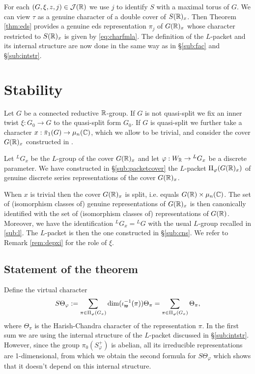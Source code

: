 \documentclass{article}
\theoremstyle{definition}
\numberwithin{equation}{section}
\renewcommand{\-}{\hyp{}}
\begin{document}
For each $(G,\xi,z,j) \in \mathcal{J}(\mathbb{R})$ we use $j$ to identify $S$ with a maximal torus of $G$. We can view $\tau$ as a genuine character of a double cover of $S(\mathbb{R})_x$. Then Theorem \ref{thm:eds} provides a genuine eds representation $\pi_j$ of $G(\mathbb{R})_x$ whose character restricted to $S(\mathbb{R})_x$ is given by \eqref{eq:charfmla}. The definition of the $L$-packet and its internal structure are now done in the same way as in \S\ref{sub:fac} and \S\ref{sub:intstr}.

\section{Stability} \label{sec:stab}

Let $G$ be a connected reductive $\mathbb{R}$-group. If $G$ is not quasi-split we fix an inner twist $\xi : G_0 \to G$ to the quasi-split form $G_0$. If $G$ is quasi-split we further take a character $x : \bar\pi_1(G) \to \mu_n(\mathbb{C})$, which we allow to be trivial, and consider the cover $G(\mathbb{R})_x$ constructed in \cite{KalHDC}. 

Let $^LG_x$ be the $L$-group of the cover $G(\mathbb{R})_x$ and let $\varphi : W_{\mathbb{R}} \to {^LG_x}$ be a discrete parameter. We have constructed in \S\ref{sub:packetcover} the $L$-packet $\Pi_\varphi(G(\mathbb{R})_x)$ of genuine discrete series representations of the cover $G(\mathbb{R})_x$.


When $x$ is trivial then the cover $G(\mathbb{R})_x$ is split, i.e. equals $G(\mathbb{R}) \times \mu_n(\mathbb{C})$. The set of (isomorphism classes of) genuine representations of $G(\mathbb{R})_x$ is then canonically identified with the set of (isomorphism classes of) representations of $G(\mathbb{R})$. Moreover, we have the identification $^LG_x={^LG}$ with the usual $L$-group recalled in \ref{sub:l}. The $L$-packet is then the one constructed in \S\ref{sub:cns}. We refer to Remark \ref{rem:depxi} for the role of $\xi$.




\subsection{Statement of the theorem} 

Define the virtual character 
\begin{equation}
	S\Theta_\varphi	:= \sum_{\pi \in \Pi_\varphi(G_x)} \dim(\iota_{\mathfrak{w}}^{-1}(\pi))\Theta_\pi =  \sum_{\pi \in \Pi_\varphi(G_x)} \Theta_\pi,
\end{equation}
where $\Theta_\pi$ is the Harish-Chandra character of the representation $\pi$. In the first sum we are using the internal structure of the $L$-packet discussed in \S\ref{sub:intstr}. However, since the group $\pi_0(S_\varphi^+)$ is abelian, all its irreducible representations are 1-dimensional, from which we obtain the second formula for $S\Theta_\varphi$ which shows that it doesn't depend on this internal structure.
\end{document}
